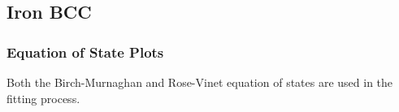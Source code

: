 
\clearpage
\FloatBarrier
\subsection{Iron BCC}






\subsubsection{Equation of State Plots}

Both the Birch-Murnaghan and Rose-Vinet equation of states are used in the fitting process.

